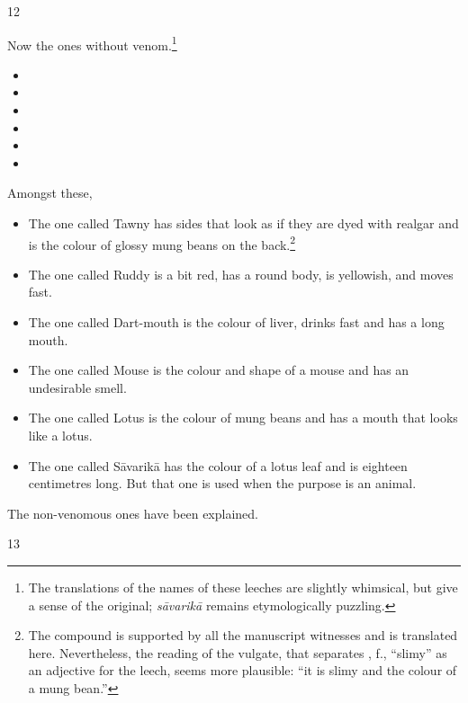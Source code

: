 \begin{translation}
\item[12]

Now the ones without venom.\footnote{The translations of the names of these 
leeches are slightly whimsical, but give a sense of the original; \emph{sāvarikā} 
remains etymologically puzzling.} 
\begin{itemize}
    \item {}
    \item {}
    \item {}
    \item {}
    \item {}
    \item {}
\end{itemize}
Amongst these,
\begin{itemize}
    \item The one called Tawny has sides that look as if they are dyed with
realgar and is the colour of glossy mung beans on the back.\footnote{The
    compound  is supported by all the manuscript
    witnesses and is translated here.  Nevertheless, the reading of the
    vulgate, that separates , f., “slimy” as an adjective for the
    leech, seems more plausible: “it is slimy and the colour of a mung
    bean.”}
    
    \item The one called Ruddy is a bit red, has a round body, is yellowish, and 
    moves fast.
    
    \item The one called Dart-mouth is the colour of liver, drinks fast and has a long 
    mouth.
    
    \item The one called Mouse is the colour and shape of a mouse and has an 
    undesirable smell.
    
    \item The one called Lotus is the colour of mung beans and has a mouth that looks 
    like a lotus.
    
    \item The one called Sāvarikā has the colour of a lotus leaf and is eighteen 
    centimetres long.  But that one is used when the purpose is an animal. 
\end{itemize}
The non-venomous ones have been explained.

\item [13]


\end{translation}
